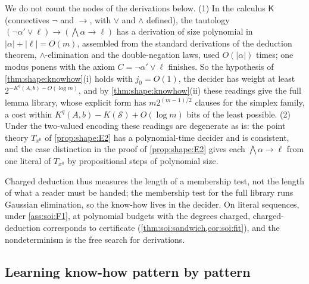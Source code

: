 \begin{remark}\label{rem:shape:knowhowsketch}
We do not count the nodes of the derivations below. (1) In the calculus $\mathsf K$ (connectives $\neg$ and $\to$, with $\vee$ and $\wedge$ defined), the tautology $(\neg\alpha'\vee\ell)\to(\bigwedge\alpha\to\ell)$ has a derivation of size polynomial in $\lvert\alpha\rvert+\lvert\ell\rvert=O(m)$, assembled from the standard derivations of the deduction theorem, $\wedge$-elimination and the double-negation laws, used $O(\lvert\alpha\rvert)$ times; one modus ponens with the axiom $C=\neg\alpha'\vee\ell$ finishes. So the hypothesis of \cref{thm:shape:knowhow}(i) holds with $j_0=O(1)$, the decider has weight at least $2^{-K^q(A,b)-O(\log m)}$, and by \cref{thm:shape:knowhow}(ii) these readings give the full lemma library, whose explicit form has $m2^{(m-1)/2}$ clauses for the simplex family, a cost within $K^q(A,b)-K(\mathcal S)+O(\log m)$ bits of the least possible. (2) Under the two-valued encoding these readings are degenerate as \SAIabbr is: the point theory $T_{x^0}$ of \cref{prop:shape:E2} has a polynomial-time decider and is consistent, and the case distinction in the proof of \cref{prop:shape:E2} gives each $\bigwedge\alpha\to\ell$ from one literal of $T_{x^0}$ by propositional steps of polynomial size.
\end{remark}

Charged deduction thus measures the length of a membership test, not the length of what a reader must be handed; the membership test for the full library runs Gaussian elimination, so the know-how lives in the decider. On literal sequences, under \cref{ass:soi:F1}, at polynomial budgets with the degrees charged, charged-deduction \SAIabbr corresponds to certificate \SOIabbr (\cref{thm:soi:sandwich,cor:soi:fit}), and the nondeterminism is the free search for derivations.

\subsection{Learning know-how pattern by pattern}\label{app:shape:learning}

